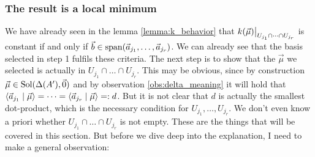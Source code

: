 \subsubsection{The result is a local minimum}
We have already seen in the lemma \ref{lemma:k_behavior} that $\restrict{k(\vec\mu)}{U_{j_1}\cap \dots \cap U_{j_r}}$ is constant if and only if $\vec b \in \operatorname{span}(\vec a_{j_1}, \dots, \vec a_{j_r})$. We can already see that the basis selected in step 1 fulfils these criteria. The next step is to show that the $\vec\mu$ we selected is actually in $U_{j_1} \cap \dots \cap U_{j_r}$. This may be obvious, since by construction $\vec\mu \in \operatorname{Sol}(\Delta(A'), \vec 0)$ and by observation \ref{obs:delta_meaning} it will hold that $\langle \vec a_{j_1} \mid \vec\mu \rangle = \dots = \langle \vec a_{j_r} \mid \vec\mu \rangle =: d$. But it is not clear that $d$ is actually the smallest dot-product, which is the necessary condition for $U_{j_1}, \dots, U_{j_r}$. We don't even know a priori whether ${U_{j_1} \cap \dots \cap U_{j_r}}$ is not empty. These are the things that will be covered in this section. But before we dive deep into the explanation, I need to make a general observation:

